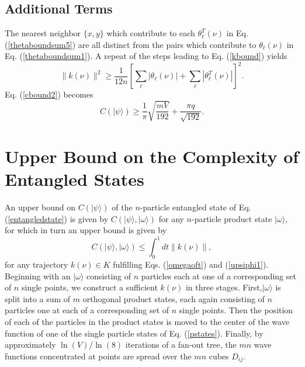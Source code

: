 \documentclass[twocolumn,amsmath,amssymb]{revtex4-1}
\begin{document}
\subsection{\label{subsec:additional} Additional Terms}

The nearest neighbor $\{x,y\}$ which contribute to each $\theta^T_{\ell}(\nu)$
in Eq. (\ref{thetaboundsum5}) are all distinct from the pairs which
contribute to $\theta_{\ell}(\nu)$
in Eq. (\ref{thetaboundsum1}). A repeat of the steps leading to
Eq. (\ref{kbound}) yields
\begin{equation}
\label{kbound2}
\parallel k(\nu) \parallel^2 \ge
\frac{1}{12 n} [\sum_{\ell} |\theta_{\ell}(\nu)| + \sum_{\ell} |\theta^T_{\ell}(\nu)| ] ^ 2.
\end{equation}
Eq. (\ref{cbound2}) becomes
\begin{equation}
\label{cbound3}
C( |\psi \rangle ) \ge \frac{1}{\pi} \sqrt{ \frac{ mV}{192}} + \frac{\pi q}{ \sqrt{192}}.
\end{equation}




\section{\label{app:upperbound} Upper Bound on the Complexity of Entangled States}


An upper bound on $C( |\psi \rangle )$ of the $n$-particle entangled state of Eq. (\ref{entangledstate}) 
is given by $C( |\psi \rangle , |\omega \rangle )$ for any $n$-particle product state
$|\omega \rangle $, for which in turn an upper bound is given by 
\begin{equation}
\label{cpsiomega}
C( |\psi \rangle , |\omega \rangle ) \le \int_0^1 d t \parallel k( \nu) \parallel,
\end{equation} 
for any 
trajectory $k(\nu) \in K$ fulfilling Eqs. (\ref{omegaoft}) and (\ref{upsiphi1}).
Beginning with an $|\omega \rangle $
consisting of $n$ particles each at one of a corresponding set of
$n$ single points, we construct a sufficient $k(\nu)$ in three stages.
First,$|\omega \rangle $
is split into a sum of $m$ orthogonal product states, each again consisting
of $n$ particles one at each of a corresponding set of $n$ single points. Then the 
position of each of the particles in the product states is moved to the center of
the wave function of one of the single particle states of Eq. (\ref{pstates}). 
Finally, by approximately $\ln( V) / \ln( 8)$ iterations of a
fan-out tree, the $m n$ wave functions concentrated at points are spread over the 
$m n$ cubes $D_{ij}$.
\end{document}
